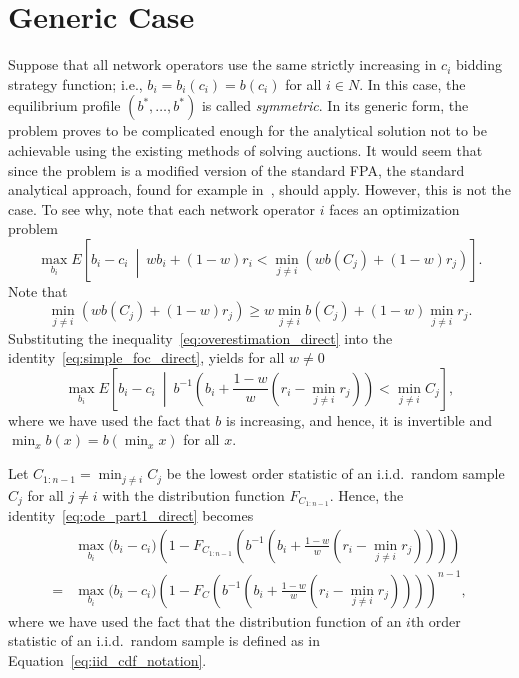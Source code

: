 \section{Generic Case} %
\label{sec:direct_generic_case_direct}
Suppose that all network operators use the same strictly increasing in $c_i$ bidding strategy function; i.e., $b_i = b_i(c_i) = b(c_i)$ for all $i\in N$. In this case, the equilibrium profile $(b^*,\ldots,b^*)$ is called \emph{symmetric}. In its generic form, the problem proves to be complicated enough for the analytical solution not to be achievable using the existing methods of solving auctions. It would seem that since the problem is a modified version of the standard FPA, the standard analytical approach, found for example in~\cite{Krishna10,McAfee1987,Hansen88,Dastidar08}, should apply. However, this is not the case. To see why, note that each network operator $i$ faces an optimization problem
\begin{equation}
	\label{eq:simple_foc_direct}
	\max_{b_i}E\left[ b_i-c_i \:\middle\vert\: wb_i + (1-w)r_i < \displaystyle\min_{j\neq i}(wb(C_j) + (1-w)r_j) \right].
\end{equation}
Note that
\begin{equation}
	\label{eq:overestimation_direct}
	\displaystyle\min_{j\neq i}(wb(C_j) + (1-w)r_j) \ge w\displaystyle\min_{j\neq i}b(C_j) + (1-w)\displaystyle\min_{j\neq i}r_j.
\end{equation}
Substituting the inequality~\eqref{eq:overestimation_direct} into the identity~\eqref{eq:simple_foc_direct}, yields for all $w\neq 0$
\begin{equation}
	\max_{b_i}E\left[ b_i-c_i \:\middle\vert\: b^{-1}\left(b_i + \frac{1-w}{w}(r_i-\displaystyle\min_{j\neq i}r_j)\right) < \displaystyle\min_{j\neq i}C_j \right],
	\label{eq:ode_part1_direct}
\end{equation}
where we have used the fact that $b$ is increasing, and hence, it is invertible and $\min_{x}b(x) = b(\min_{x}x)$ for all $x$.

Let $C_{1:n-1} = \min_{j\neq i}C_j$ be the lowest order statistic of an i.i.d.~random sample $C_j$ for all $j\neq i$ with the distribution function $F_{C_{1:n-1}}$. Hence, the identity~\eqref{eq:ode_part1_direct} becomes
\begin{align}
	&\max_{b_i}\bigg(b_i-c_i\bigg)\left(1 - F_{C_{1:n-1}}\left(b^{-1}\left(b_i + \frac{1-w}{w}(r_i-\min_{j\neq i}r_j)\right)\right)\right) \nonumber\\
	= &\max_{b_i}\bigg(b_i-c_i\bigg)\left(1 - F_{C}\left(b^{-1}\left(b_i + \frac{1-w}{w}(r_i-\min_{j\neq i}r_j)\right)\right)\right)^{n-1},
	\label{eq:ode_part2_direct}
\end{align}
where we have used the fact that the distribution function of an $i$th order statistic of an i.i.d.~random sample is defined as in Equation~\eqref{eq:iid_cdf_notation}.

